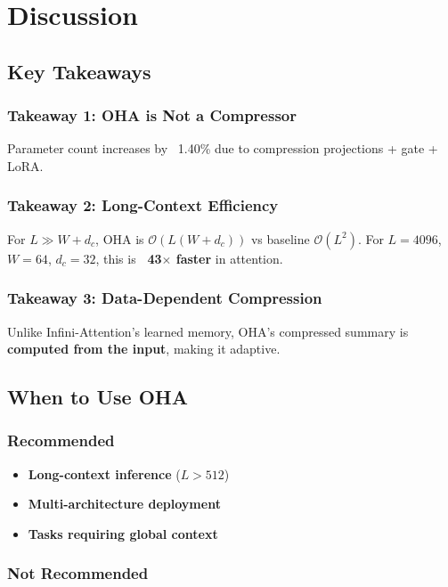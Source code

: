 
\section{Discussion}

\subsection{Key Takeaways}

\subsubsection{Takeaway 1: OHA is Not a Compressor}

Parameter count increases by ~1.40\% due to compression 
projections + gate + LoRA.

\subsubsection{Takeaway 2: Long-Context Efficiency}

For $L \gg W + d_c$, OHA is $\mathcal{O}(L(W + d_c))$ vs baseline 
$\mathcal{O}(L^2)$. For $L = 4096$, $W = 64$, $d_c = 32$, this is 
\textbf{~43$\times$ faster} in attention.

\subsubsection{Takeaway 3: Data-Dependent Compression}

Unlike Infini-Attention's learned memory, OHA's compressed summary is 
\textbf{computed from the input}, making it adaptive.

\subsection{When to Use OHA}

\subsubsection{Recommended}

\begin{itemize}
\item \textbf{Long-context inference} ($L > 512$)
\item \textbf{Multi-architecture deployment}
\item \textbf{Tasks requiring global context}

\end{itemize}
\subsubsection{Not Recommended}

